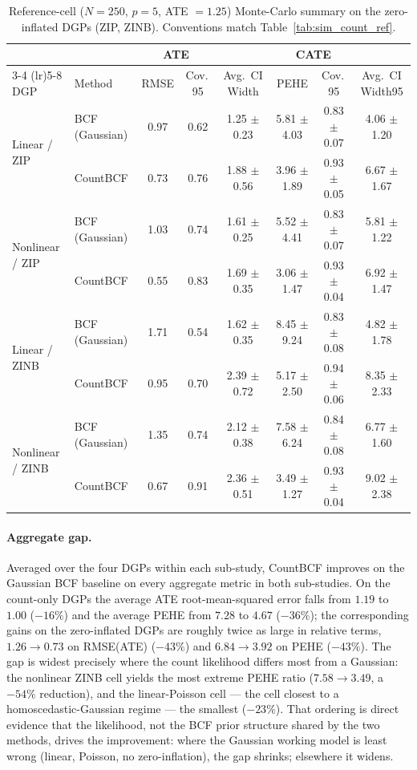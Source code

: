 \documentclass[11pt]{article}
\theoremstyle{plain}
\theoremstyle{definition}
\theoremstyle{remark}
\begin{document}
\begin{table}[h!]\footnotesize
\caption{Reference-cell ($N = 250$, $p = 5$, ATE $= 1.25$) Monte-Carlo summary on the zero-inflated DGPs (ZIP, ZINB). Conventions match Table~\ref{tab:sim_count_ref}.}\label{tab:sim_zi_ref}
\centering
\begin{tabular*}{\linewidth}{ @{\extracolsep{\fill}} ll cc cccc @{}}
\toprule
 &  & \multicolumn{2}{c}{ATE} & \multicolumn{4}{c}{CATE} \\
\cmidrule(lr){3-4} \cmidrule(lr){5-8}
DGP & Method & RMSE & Cov.\,95 & Avg.\ CI Width & PEHE & Cov.\,95 & Avg.\ CI Width95 \\
\midrule
\multirow{2}{*}{Linear / ZIP} & BCF (Gaussian) & 0.97 & 0.62 & 1.25 $\pm$ 0.23 & 5.81 $\pm$ 4.03 & 0.83 $\pm$ 0.07 & 4.06 $\pm$ 1.20 \\
 & CountBCF & 0.73 & 0.76 & 1.88 $\pm$ 0.56 & 3.96 $\pm$ 1.89 & 0.93 $\pm$ 0.05 & 6.67 $\pm$ 1.67 \\
\midrule
\multirow{2}{*}{Nonlinear / ZIP} & BCF (Gaussian) & 1.03 & 0.74 & 1.61 $\pm$ 0.25 & 5.52 $\pm$ 4.41 & 0.83 $\pm$ 0.07 & 5.81 $\pm$ 1.22 \\
 & CountBCF & 0.55 & 0.83 & 1.69 $\pm$ 0.35 & 3.06 $\pm$ 1.47 & 0.93 $\pm$ 0.04 & 6.92 $\pm$ 1.47 \\
\midrule
\multirow{2}{*}{Linear / ZINB} & BCF (Gaussian) & 1.71 & 0.54 & 1.62 $\pm$ 0.35 & 8.45 $\pm$ 9.24 & 0.83 $\pm$ 0.08 & 4.82 $\pm$ 1.78 \\
 & CountBCF & 0.95 & 0.70 & 2.39 $\pm$ 0.72 & 5.17 $\pm$ 2.50 & 0.94 $\pm$ 0.06 & 8.35 $\pm$ 2.33 \\
\midrule
\multirow{2}{*}{Nonlinear / ZINB} & BCF (Gaussian) & 1.35 & 0.74 & 2.12 $\pm$ 0.38 & 7.58 $\pm$ 6.24 & 0.84 $\pm$ 0.08 & 6.77 $\pm$ 1.60 \\
 & CountBCF & 0.67 & 0.91 & 2.36 $\pm$ 0.51 & 3.49 $\pm$ 1.27 & 0.93 $\pm$ 0.04 & 9.02 $\pm$ 2.38 \\
\bottomrule
\end{tabular*}
\end{table}

\paragraph{Aggregate gap.} Averaged over the four DGPs within each
sub-study, CountBCF improves on the Gaussian BCF baseline on every
aggregate metric in both sub-studies. On the count-only DGPs the
average ATE root-mean-squared error falls from $1.19$ to $1.00$
($-16\%$) and the average PEHE from $7.28$ to $4.67$ ($-36\%$); the
corresponding gains on the zero-inflated DGPs are roughly twice as
large in relative terms, $1.26 \to 0.73$ on RMSE(ATE) ($-43\%$) and
$6.84 \to 3.92$ on PEHE ($-43\%$). The gap is widest precisely where
the count likelihood differs most from a Gaussian: the nonlinear
ZINB cell yields the most extreme PEHE ratio
($7.58 \to 3.49$, a $-54\%$ reduction), and the linear-Poisson cell
--- the cell closest to a homoscedastic-Gaussian regime --- the
smallest ($-23\%$). That ordering is direct evidence that the
likelihood, not the BCF prior structure shared by the two methods,
drives the improvement: where the Gaussian working model is least
wrong (linear, Poisson, no zero-inflation), the gap shrinks;
elsewhere it widens.
\end{document}
